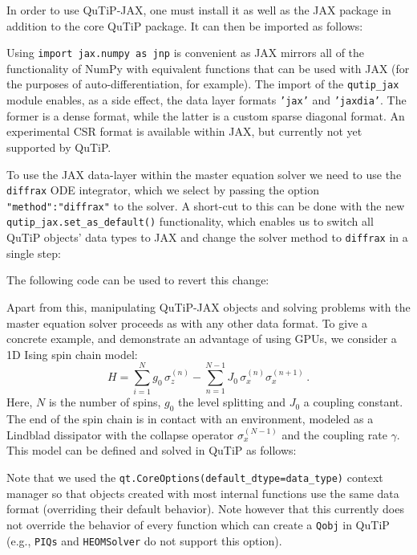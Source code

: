 \documentclass[preprint,3p,sort&compress]{elsarticle}
\def\code#1{\texttt{#1}}
\begin{document}
In order to use QuTiP-JAX, one must install it as well as the JAX package in addition to the core QuTiP package. It can then be imported as follows:

%
Using \code{import jax.numpy as jnp} is convenient as JAX mirrors all of the functionality of NumPy with equivalent functions that can be used with JAX (for the purposes of auto-differentiation, for example). The import of the \code{qutip\_jax} module enables, as a side effect, the data layer formats \code{'jax'} and \code{'jaxdia'}.  The former is a dense format, while the latter is a custom sparse diagonal format.  An experimental CSR format is available within JAX, but currently not yet supported by QuTiP.  


To use the JAX data-layer within the master equation solver we need to use the \code{diffrax} ODE integrator, which we select by passing the option \code{"method":"diffrax"} to the solver.
A short-cut to this can be done with the new \code{qutip\_jax.set\_as\_default()} functionality, which enables us to switch all QuTiP objects' data types to JAX and change the solver method to \code{diffrax} in a single step:

%
The following code can be used to revert this change:


Apart from this, manipulating QuTiP-JAX objects and solving problems with the master equation solver proceeds as with any other data format.  To give a concrete example, and demonstrate an advantage of using GPUs, we consider a 1D Ising spin chain model:
\begin{equation}
    H = \sum_{i=1}^N g_0\, \sigma_z^{(n)} - \sum_{n=1}^{N-1} J_0\, \sigma_x^{(n)} \sigma_x^{(n+1)} \, .
\end{equation}
Here, $N$ is the number of spins, $g_0$ the level splitting and $J_0$ a coupling constant. The end of the spin chain is in contact with an environment, modeled as a Lindblad dissipator with the collapse operator $\sigma_x^{(N-1)}$ and the coupling rate $\gamma$. This model can be defined and solved in QuTiP as follows:

%
Note that we used the \code{qt.CoreOptions(default\_dtype=data\_type)} context manager so that objects  created with most internal functions use the same data format (overriding their default behavior). Note however that this currently does not override the behavior of every function which can create a \code{Qobj} in QuTiP (e.g., \code{PIQs} and \code{HEOMSolver} do not support this option).
\end{document}
